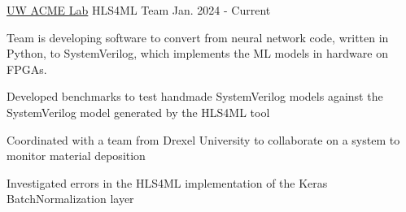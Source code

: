 \vspace{\sectionpadding}
\entry
    {\href{https://www.routledge.com/Exploring-Extended-Realities-Metaphysical-Psychological-and-Ethical-Challenges/Kissel-Ramirez/p/book/9781032417325}{UW ACME Lab}}
    {HLS4ML Team}
    {Jan. 2024 - Current}
    {
    Team is developing software to convert from neural network code, written in Python, to SystemVerilog, which implements the ML models in hardware on FPGAs.
    \begin{condenseditemize}
        \item Developed benchmarks to test handmade SystemVerilog models against the SystemVerilog model generated by the HLS4ML tool
        \item Coordinated with a team from Drexel University to collaborate on a system to monitor material deposition
        \item Investigated errors in the HLS4ML implementation of the Keras BatchNormalization layer
    \end{condenseditemize}
    }
